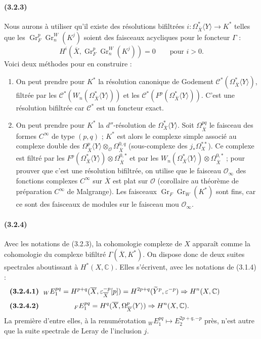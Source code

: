\documentclass[10pt]{article}
\newcommand{\C}{\mathbb C}
\newcommand{\Gr}{\operatorname{Gr}}
\begin{document}
\paragraph{(3.2.3)} Nous aurons à utiliser qu'il existe des résolutions bifiltrées $i:\Omega_{\overline X}^{*}\langle Y\rangle\longrightarrow K^*$ telles que les $\Gr_F^p\Gr_n^W(K^j)$ soient des faisceaux acycliques pour le foncteur $\Gamma$ :
\[
H^i(\overline X,\Gr_F^p\Gr_n^W(K^j))=0\qquad \text{pour }i>0.
\]
Voici deux méthodes pour en construire :
\begin{enumerate}[label=\textit{\alph*)}]
\item On peut prendre pour $K^*$ la résolution canonique de Godement $\mathcal C^*(\Omega_{\overline X}^{*}\langle Y\rangle)$, filtrée par les $\mathcal C^*(W_n(\Omega_{\overline X}^{*}\langle Y\rangle))$ et les $\mathcal C^*(F^p(\Omega_{\overline X}^{*}\langle Y\rangle))$. C'est une résolution bifiltrée car $\mathcal C^*$ est un foncteur exact.
\item On peut prendre pour $K^*$ la $d''$-résolution de $\Omega_{\overline X}^{*}\langle Y\rangle$. Soit $\Omega_{\overline X}^{pq}$ le faisceau des formes $C^\infty$ de type $(p,q)$ ; $K^*$ est alors le complexe simple associé au complexe double des $\Omega_{\overline X}^{p}\langle Y\rangle\otimes_{\mathcal O}\Omega_{\overline X}^{0,q}$ (sous-complexe des $j_*\Omega_X^{**}$). Ce complexe est filtré par les $F^p(\Omega_{\overline X}^{*}\langle Y\rangle)\otimes\Omega_{\overline X}^{0,*}$ et par les $W_n(\Omega_{\overline X}^{*}\langle Y\rangle)\otimes\Omega_{\overline X}^{0,*}$ ; pour prouver que c'est une résolution bifiltrée, on utilise que le faisceau $\mathcal O_\infty$ des fonctions complexes $C^\infty$ sur $\overline X$ est plat sur $\mathcal O$ (corollaire au théorème de préparation $C^\infty$ de Malgrange). Les faisceaux $\Gr_F\Gr_W(K^*)$ sont fins, car ce sont des faisceaux de modules sur le faisceau mou $\mathcal O_\infty$.
\end{enumerate}

\paragraph{(3.2.4)} Avec les notations de (3.2.3), la cohomologie complexe de $X$ apparaît comme la cohomologie du complexe bifiltré $\Gamma(\overline X,K^*)$. On dispose donc de deux suites spectrales aboutissant à $H^*(X,\C)$. Elles s'écrivent, avec les notations de (3.1.4) :
\[
\makebox[\textwidth][s]{\textbf{(3.2.4.1)}\hfill$\displaystyle {}_W E_1^{pq}=H^{p+q}(\overline X,\varepsilon_{\overline X}^{-p}[p])=H^{2p+q}(\widetilde Y^p,\varepsilon^{-p})\Rightarrow H^n(X,\C)$\hfill\phantom{\textbf{(3.2.4.1)}}}
\]
\[
\makebox[\textwidth][s]{\textbf{(3.2.4.2)}\hfill$\displaystyle {}_F E_1^{pq}=H^q(\overline X,\Omega_{\overline X}^p\langle Y\rangle)\Rightarrow H^n(X,\C).$\hfill\phantom{\textbf{(3.2.4.2)}}}
\]
La première d'entre elles, à la renumérotation ${}_W E_1^{pq}\mapsto E_2^{2p+q,-p}$ près, n'est autre que la suite spectrale de Leray de l'inclusion $j$.
\end{document}
